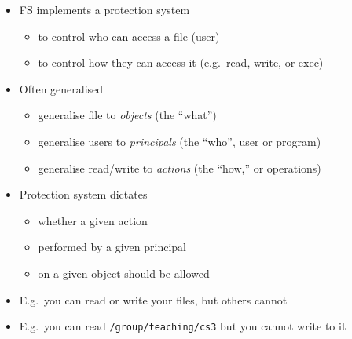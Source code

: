 \documentclass[11pt,a4paper]{article}
\begin{document}
\begin{itemize}
    \item FS implements a protection system
        \begin{itemize}
            \item to control who can access a file (user)
            \item to control how they can access it (e.g.\ read, write, or exec)
        \end{itemize}
    \item Often generalised
        \begin{itemize}
            \item generalise file to \emph{objects} (the ``what'')
            \item generalise users to \emph{principals} (the ``who'', user or program)
            \item generalise read/write to \emph{actions} (the ``how,'' or operations)
        \end{itemize}
    \item Protection system dictates
        \begin{itemize}
            \item whether a given action
            \item performed by a given principal
            \item on a given object should be allowed
        \end{itemize}
    \item E.g.\ you can read or write your files, but others cannot
    \item E.g.\ you can read \texttt{/group/teaching/cs3} but you cannot write to it
\end{itemize}
\end{document}
